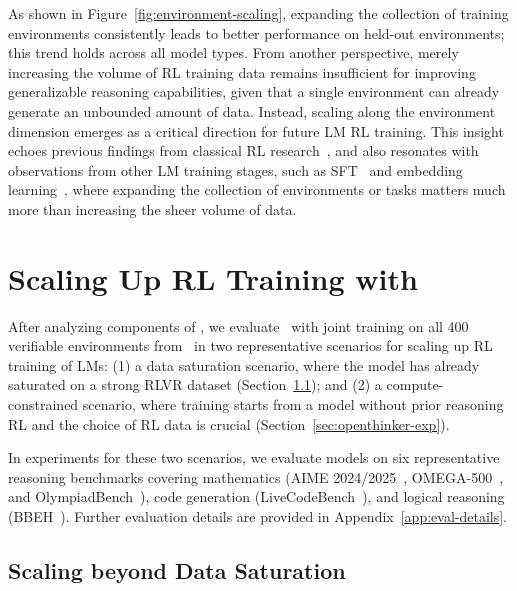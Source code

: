 \documentclass{article}
\theoremstyle{plain}
\theoremstyle{definition}
\theoremstyle{remark}
\begin{document}
As shown in Figure~\ref{fig:environment-scaling}, expanding the collection of training environments consistently leads to better performance on held-out environments;
this trend holds across all model types.
From another perspective, merely increasing the volume of RL training data remains insufficient for improving generalizable reasoning capabilities, given that a single environment can already generate an unbounded amount of data.
Instead, scaling along the environment dimension emerges as a critical direction for future LM RL training.
This insight echoes previous findings from classical RL research~\citep{cobbe2020proceduralgeneration}, and also resonates with observations from other LM training stages, such as SFT~\citep{wang2022supernaturalinstructions} and embedding learning~\citep{su2023instructor}, where expanding the collection of environments or tasks matters much more than increasing the sheer volume of data.








\section{Scaling Up RL Training with \ours{}}
\label{sec:main-exp}
After analyzing components of \ours{},
we evaluate~\ours{} with joint training on all 400 verifiable environments from~\suite{} in two representative scenarios for scaling up RL training of LMs:
(1) a data saturation scenario, where the model has already saturated on a strong RLVR dataset (Section~\ref{sec:prorl-exp}); and
(2) a compute-constrained scenario, where training starts from a model without prior reasoning RL and the choice of RL data is crucial (Section~\ref{sec:openthinker-exp}).

In experiments for these two scenarios, we evaluate models on six representative reasoning benchmarks covering mathematics (AIME 2024/2025~\citep{aime}, OMEGA-500~\citep{sun2025omega}, and OlympiadBench~\citep{he2024olympiadbench}), code generation (LiveCodeBench~\citep{jain2025lcb}), and logical reasoning (BBEH~\citep{kazemi2025bbeh}). 
Further evaluation details are provided in Appendix~\ref{app:eval-details}.

\subsection{Scaling beyond Data Saturation}
\label{sec:prorl-exp}
\end{document}
